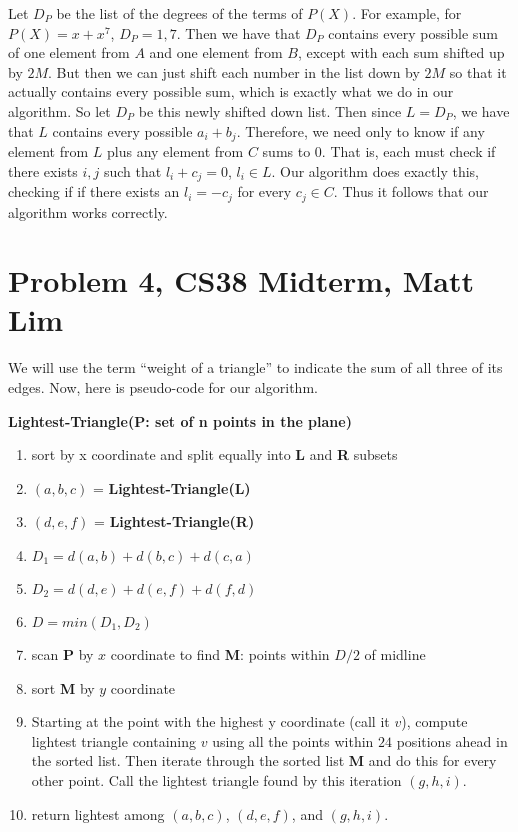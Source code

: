\documentclass{article}
\begin{document}
\begin{description}
        Let $D_P$ be the list of the degrees of the terms of $P(X)$. For
        example, for $P(X) = x + x^7$, $D_P = 1, 7$. Then we have that $D_P$
        contains every possible sum of one element from $A$ and one element from
        $B$, except with each sum shifted up by $2M$. But then we can just shift
        each number in the list down by $2M$ so that it actually contains every
        possible sum, which is exactly what we do in our algorithm. So let $D_P$
        be this newly shifted down list.
        Then since $L = D_P$, we have that $L$ contains every possible $a_i
        + b_j$. Therefore, we need only to know
        if any element from $L$ plus any element from $C$ sums to $0$. That is,
        each must check if there exists $i,j$ such that $l_i + c_j = 0$, $l_i
        \in L$. Our algorithm does exactly this, checking if if there exists an
        $l_i = -c_j$ for every $c_j \in C$. Thus it follows that our algorithm
        works correctly.

\end{description}
\newpage

\section*{Problem 4, CS38 Midterm, Matt Lim}
We will use the term ``weight of a triangle'' to indicate the sum of all three
of its edges. Now, here is pseudo-code for our algorithm.

\vspace{5mm}
\noindent \textbf{Lightest-Triangle(P: set of n points in the plane)}
\begin{enumerate}
    \item sort by x coordinate and split equally into \textbf{L} and \textbf{R} subsets
    \item $(a,b,c)$ = \textbf{Lightest-Triangle(L)}
    \item $(d,e,f)$ = \textbf{Lightest-Triangle(R)}
    \item $D_1 = d(a,b) + d(b,c) + d(c,a)$
    \item $D_2 = d(d,e) + d(e,f) + d(f,d)$
    \item $D = min(D_1, D_2)$
    \item scan \textbf{P} by $x$ coordinate to find \textbf{M}: points within $D/2$ of midline
    \item sort \textbf{M} by $y$ coordinate
    \item Starting at the point with the highest y coordinate (call it $v$),
        compute lightest triangle containing $v$ using all the points within
        $24$ positions ahead in the sorted list. Then iterate through the sorted
        list \textbf{M} and do this for every other point. Call the lightest triangle found
        by this iteration $(g,h,i)$.
    \item return lightest among $(a,b,c)$, $(d,e,f)$, and $(g,h,i)$.
\end{enumerate}
\end{document}
